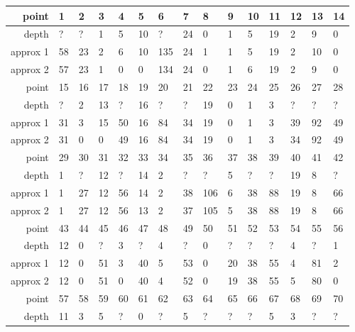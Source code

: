 \begin{center}
  \tablefirsthead{\hline}
  \tablelasttail{\hline}
  \begin{supertabular}{|r|l l l l l l l l l l l l l l|}
\hline
point & 1 & 2 & 3 & 4 & 5 & 6 & 7 & 8 & 9 & 10 & 11 & 12 & 13 & 14 \\
\hline
depth & ? & ? & 1 & 5 & 10 & ? & 24 & 0 & 1 & 5 & 19 & 2 & 9 & 0 \\
approx 1 & 58 & 23 & 2 & 6 & 10 & 135 & 24 & 1 & 1 & 5 & 19 & 2 & 10 & 0 \\
approx 2 & 57 & 23 & 1 & 0 & 0 & 134 & 24 & 0 & 1 & 6 & 19 & 2 & 9 & 0 \\
\hline
point & 15 & 16 & 17 & 18 & 19 & 20 & 21 & 22 & 23 & 24 & 25 & 26 & 27 & 28 \\
\hline
depth & ? & 2 & 13 & ? & 16 & ? & ? & 19 & 0 & 1 & 3 & ? & ? & ? \\
approx 1 & 31 & 3 & 15 & 50 & 16 & 84 & 34 & 19 & 0 & 1 & 3 & 39 & 92 & 49 \\
approx 2 & 31 & 0 & 0 & 49 & 16 & 84 & 34 & 19 & 0 & 1 & 3 & 34 & 92 & 49 \\
\hline
point & 29 & 30 & 31 & 32 & 33 & 34 & 35 & 36 & 37 & 38 & 39 & 40 & 41 & 42 \\
\hline
depth & 1 & ? & 12 & ? & 14 & 2 & ? & ? & 5 & ? & ? & 19 & 8 & ? \\
approx 1 & 1 & 27 & 12 & 56 & 14 & 2 & 38 & 106 & 6 & 38 & 88 & 19 & 8 & 66 \\
approx 2 & 1 & 27 & 12 & 56 & 13 & 2 & 37 & 105 & 5 & 38 & 88 & 19 & 8 & 66 \\
\hline
point & 43 & 44 & 45 & 46 & 47 & 48 & 49 & 50 & 51 & 52 & 53 & 54 & 55 & 56 \\
\hline
depth & 12 & 0 & ? & 3 & ? & 4 & ? & 0 & ? & ? & ? & 4 & ? & 1 \\
approx 1 & 12 & 0 & 51 & 3 & 40 & 5 & 53 & 0 & 20 & 38 & 55 & 4 & 81 & 2 \\
approx 2 & 12 & 0 & 51 & 0 & 40 & 4 & 52 & 0 & 19 & 38 & 55 & 5 & 80 & 0 \\
\hline
point & 57 & 58 & 59 & 60 & 61 & 62 & 63 & 64 & 65 & 66 & 67 & 68 & 69 & 70 \\
\hline
depth & 11 & 3 & 5 & ? & 0 & ? & 5 & ? & ? & ? & 5 & 3 & ? & ? \\

\end{supertabular}
\end{center}
